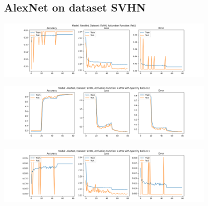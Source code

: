 \documentclass[a4paper]{article}
\begin{document}
		\subsection{AlexNet on dataset SVHN}
			\begin{center}
				\centering
				\includegraphics[width=400px,keepaspectratio]{AlexNet_SVHN_ReLU}
			\end{center}
			\begin{center}
				\centering
				\includegraphics[width=400px,keepaspectratio]{AlexNet_SVHN_k-WTA_0.2.png}
			\end{center}
			\begin{center}
				\centering
				\includegraphics[width=400px,keepaspectratio]{AlexNet_SVHN_k-WTA_0.1.png}
			\end{center}
		
\end{document}
